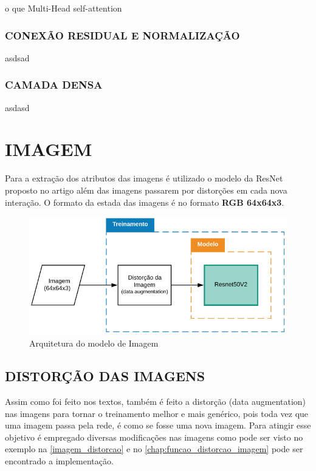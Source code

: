 o que Multi-Head self-attention


\subsubsection{CONEXÃO RESIDUAL E NORMALIZAÇÃO}
asdsad

\subsubsection{CAMADA DENSA}
asdasd


\section{IMAGEM}

Para a extração dos atributos das imagens é utilizado o modelo da ResNet proposto no artigo \cite{resnet} além das imagens passarem por distorções em cada nova interação. O formato da estada das imagens é no formato \textbf{RGB 64x64x3}.

\begin{figure}[htb]
	\caption{\label{modelo_imagem_macro} Arquitetura do modelo de Imagem}
	\begin{center}
	    \includegraphics[scale=0.5]{artigo/recursos/imagens/modelo_imagem_macro.png}
	\end{center}
\end{figure}


\subsection{DISTORÇÃO DAS IMAGENS}

Assim como foi feito nos textos, também é feito a distorção (data augmentation) nas imagens para tornar o treinamento melhor e mais genérico, pois toda vez que uma imagem passa pela rede, é como se fosse uma nova imagem. Para atingir esse objetivo é empregado diversas modificações nas imagens como pode ser visto no exemplo na \autoref{imagem_distorcao} e no \autoref{chap:funcao_distorcao_imagem} pode ser encontrado a implementação.

